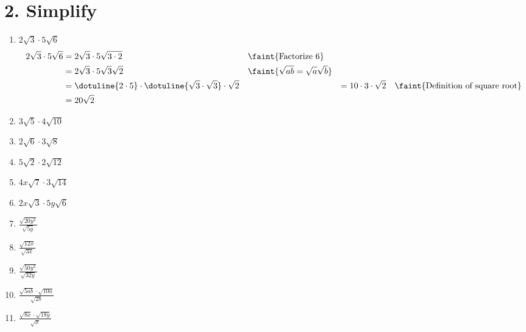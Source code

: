 \documentclass{hw}
\begin{document}
\section*{\normalsize 2. Simplify}
    \begin{enumerate}[label=\alph*.]
        \item $2\sqrt{3} \cdot 5\sqrt{6}$
            \textcolor{blue}{
            \begin{align*}
                2\sqrt{3} \cdot 5\sqrt{6} &= 2\sqrt{3} \cdot 5\sqrt{3 \cdot 2} & \leaders\hbox{A}\hfill & \faint{\text{Factorize } 6} \\
                                          &= 2\sqrt{3} \cdot 5\sqrt{3}\sqrt{2} && \faint{\sqrt{ab} = \sqrt{a}\sqrt{b}} \\
                                          &= \dotuline{2 \cdot 5} \cdot \dotuline{\sqrt{3} \cdot \sqrt{3}} \cdot \sqrt{2} && 
                                          &= 10 \cdot 3 \cdot \sqrt{2} && \faint{\text{Definition of square root}} \\
                                          &= 20 \sqrt{2}
            \end{align*}
            }
        \item $3\sqrt{5} \cdot 4\sqrt{10}$
            \studentxlargeworkspace
        \item $2\sqrt{6} \cdot 3\sqrt{8}$
            \studentxlargeworkspace
        \item $5\sqrt{2} \cdot 2\sqrt{12}$
            \studentxlargeworkspace
        \item $4x\sqrt{7} \cdot 3\sqrt{14}$
            \studentxlargeworkspace
        \item $2x\sqrt{3} \cdot 5y\sqrt{6}$
            \studentxlargeworkspace
        \item $\frac{\sqrt{20y^2}}{\sqrt{5y}}$
            \studentxlargeworkspace
        \item $\frac{\sqrt{12x}}{\sqrt{3x}}$
            \studentxlargeworkspace
        \item $\frac{\sqrt{50y^3}}{\sqrt{32y}}$
            \studentxlargeworkspace
        \item $\frac{\sqrt{5ab} \cdot \sqrt{10a}}{\sqrt{2b}}$
            \studentxlargeworkspace
        \item $\frac{\sqrt{8x} \cdot \sqrt{18y}}{\sqrt{x}}$
            \studentxlargeworkspace
    \end{enumerate} 
\end{document}
